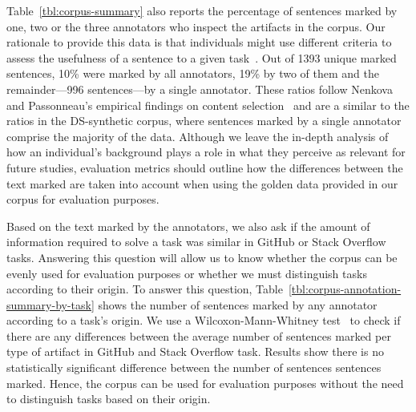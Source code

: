 \clearpage



\clearpage









Table~\ref{tbl:corpus-summary} also reports the percentage of sentences marked by one, two or the three annotators who inspect the artifacts in the corpus.
Our rationale to provide this data is that individuals might use different criteria to
assess the usefulness of a sentence to a given task~\cite{Barry1994, Barry1998}.
Out of 1393
unique marked
sentences, 
10\% were marked by all annotators,
19\% by two of them and the remainder---996 sentences---by a single annotator.
These ratios follow Nenkova and Passonneau's empirical findings on 
content selection~\cite{Nenkova2004}
and are a similar to the ratios in the \acs{DS-synthetic} corpus,
where sentences marked by a single annotator comprise the majority of the data.
Although we leave the in-depth analysis of how an individual's background plays a role in what they perceive as relevant for future studies,  evaluation metrics should outline how 
the differences between the text marked are taken into account when 
using the golden data provided in our corpus for evaluation purposes.



Based on the text marked by the annotators,   
we also ask if the amount of information required to solve a task was similar in GitHub or Stack Overflow tasks.
Answering this question will allow us to know whether 
the corpus can be evenly used for evaluation purposes or 
whether we must distinguish tasks according to their origin.
To answer this question, Table~\ref{tbl:corpus-annotation-summary-by-task} shows the number of sentences marked by any annotator according to a task's origin.
We use a Wilcoxon-Mann-Whitney test~\cite{mannWhitneyU} to check if there are any differences between the
average number of sentences marked per type of artifact in GitHub and Stack Overflow task.
Results show there is no statistically significant difference 
between the number of sentences sentences marked.
Hence, the corpus can be used for evaluation purposes without the need to distinguish tasks based on their origin.













